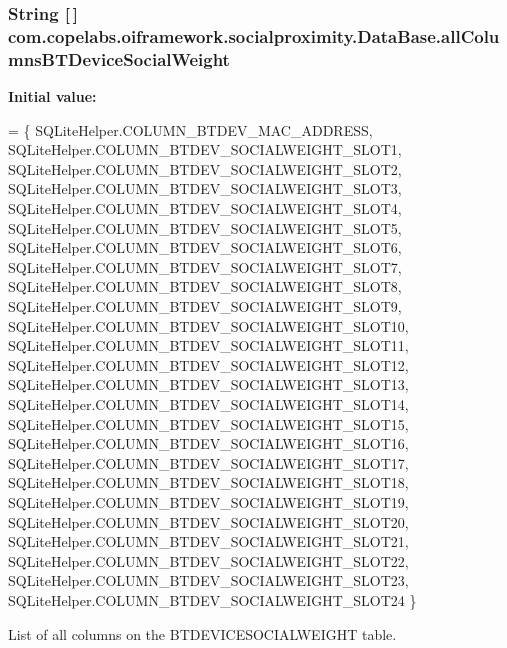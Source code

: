 \subsubsection[{all\+Columns\+B\+T\+Device\+Social\+Weight}]{\setlength{\rightskip}{0pt plus 5cm}String \mbox{[}$\,$\mbox{]} com.\+copelabs.\+oiframework.\+socialproximity.\+Data\+Base.\+all\+Columns\+B\+T\+Device\+Social\+Weight\hspace{0.3cm}{\ttfamily [private]}}\label{classcom_1_1copelabs_1_1oiframework_1_1socialproximity_1_1_data_base_a28d6c47831c7bea5716b8e35f9a34e67}
{\bfseries Initial value\+:}
\begin{DoxyCode}
= \{ 
        SQLiteHelper.COLUMN\_BTDEV\_MAC\_ADDRESS,
        SQLiteHelper.COLUMN\_BTDEV\_SOCIALWEIGHT\_SLOT1,
        SQLiteHelper.COLUMN\_BTDEV\_SOCIALWEIGHT\_SLOT2,
        SQLiteHelper.COLUMN\_BTDEV\_SOCIALWEIGHT\_SLOT3,
        SQLiteHelper.COLUMN\_BTDEV\_SOCIALWEIGHT\_SLOT4,
        SQLiteHelper.COLUMN\_BTDEV\_SOCIALWEIGHT\_SLOT5,
        SQLiteHelper.COLUMN\_BTDEV\_SOCIALWEIGHT\_SLOT6,
        SQLiteHelper.COLUMN\_BTDEV\_SOCIALWEIGHT\_SLOT7,
        SQLiteHelper.COLUMN\_BTDEV\_SOCIALWEIGHT\_SLOT8,
        SQLiteHelper.COLUMN\_BTDEV\_SOCIALWEIGHT\_SLOT9,
        SQLiteHelper.COLUMN\_BTDEV\_SOCIALWEIGHT\_SLOT10,
        SQLiteHelper.COLUMN\_BTDEV\_SOCIALWEIGHT\_SLOT11,
        SQLiteHelper.COLUMN\_BTDEV\_SOCIALWEIGHT\_SLOT12,
        SQLiteHelper.COLUMN\_BTDEV\_SOCIALWEIGHT\_SLOT13,
        SQLiteHelper.COLUMN\_BTDEV\_SOCIALWEIGHT\_SLOT14,
        SQLiteHelper.COLUMN\_BTDEV\_SOCIALWEIGHT\_SLOT15,
        SQLiteHelper.COLUMN\_BTDEV\_SOCIALWEIGHT\_SLOT16,
        SQLiteHelper.COLUMN\_BTDEV\_SOCIALWEIGHT\_SLOT17,
        SQLiteHelper.COLUMN\_BTDEV\_SOCIALWEIGHT\_SLOT18,
        SQLiteHelper.COLUMN\_BTDEV\_SOCIALWEIGHT\_SLOT19,
        SQLiteHelper.COLUMN\_BTDEV\_SOCIALWEIGHT\_SLOT20,
        SQLiteHelper.COLUMN\_BTDEV\_SOCIALWEIGHT\_SLOT21,
        SQLiteHelper.COLUMN\_BTDEV\_SOCIALWEIGHT\_SLOT22,
        SQLiteHelper.COLUMN\_BTDEV\_SOCIALWEIGHT\_SLOT23,
        SQLiteHelper.COLUMN\_BTDEV\_SOCIALWEIGHT\_SLOT24
    \}
\end{DoxyCode}
List of all columns on the B\+T\+D\+E\+V\+I\+C\+E\+S\+O\+C\+I\+A\+L\+W\+E\+I\+G\+H\+T table. \hypertarget{classcom_1_1copelabs_1_1oiframework_1_1socialproximity_1_1_data_base_a5f830f25de42020143a3481e4c687037}{}
